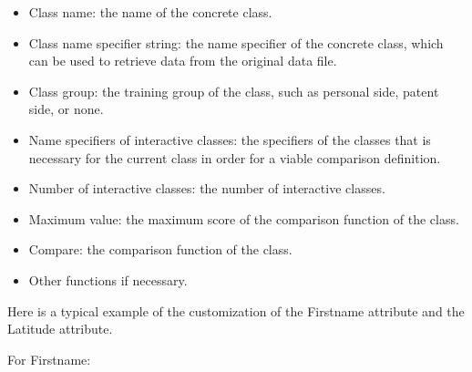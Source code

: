 \documentclass{article}
\begin{document}
\begin{itemize}

\item Class name: the name of the concrete class.

\item Class name specifier string: the name specifier
of the concrete class, which can be used to
retrieve data from the original data file.

\item Class group: the training group of the class, 
such as personal side, patent side, or none.

\item Name specifiers of interactive classes: the 
specifiers of the classes that is necessary for the
current class in order for a viable comparison definition.

\item Number of interactive classes: the number of 
interactive classes.

\item Maximum value: the maximum score of the comparison 
function of the class.

\item Compare: the comparison function of the class.

\item Other functions if necessary.

\end{itemize}

Here is a typical example of the customization of the 
Firstname attribute and the Latitude attribute.

For Firstname:
\end{document}
